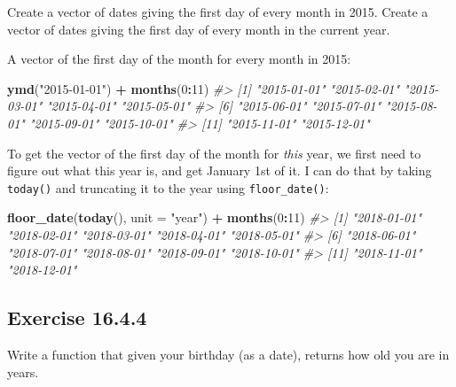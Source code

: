 \documentclass[]{book}
\newenvironment{Shaded}{\begin{snugshade}}{\end{snugshade}}
\newcommand{\CommentTok}[1]{\textcolor[rgb]{0.56,0.35,0.01}{\textit{#1}}}
\newcommand{\ControlFlowTok}[1]{\textcolor[rgb]{0.13,0.29,0.53}{\textbf{#1}}}
\newcommand{\DataTypeTok}[1]{\textcolor[rgb]{0.13,0.29,0.53}{#1}}
\newcommand{\DecValTok}[1]{\textcolor[rgb]{0.00,0.00,0.81}{#1}}
\newcommand{\KeywordTok}[1]{\textcolor[rgb]{0.13,0.29,0.53}{\textbf{#1}}}
\newcommand{\NormalTok}[1]{#1}
\newcommand{\OperatorTok}[1]{\textcolor[rgb]{0.81,0.36,0.00}{\textbf{#1}}}
\newcommand{\StringTok}[1]{\textcolor[rgb]{0.31,0.60,0.02}{#1}}
\theoremstyle{plain}
\theoremstyle{remark}
\theoremstyle{definition}
\theoremstyle{definition}
\theoremstyle{definition}
\theoremstyle{remark}
\begin{document}
Create a vector of dates giving the first day of every month in 2015.
Create a vector of dates giving the first day of every month in the
current year.

A vector of the first day of the month for every month in 2015:

\begin{Shaded}
\begin{Highlighting}[]
\KeywordTok{ymd}\NormalTok{(}\StringTok{"2015-01-01"}\NormalTok{) }\OperatorTok{+}\StringTok{ }\KeywordTok{months}\NormalTok{(}\DecValTok{0}\OperatorTok{:}\DecValTok{11}\NormalTok{)}
\CommentTok{#>  [1] "2015-01-01" "2015-02-01" "2015-03-01" "2015-04-01" "2015-05-01"}
\CommentTok{#>  [6] "2015-06-01" "2015-07-01" "2015-08-01" "2015-09-01" "2015-10-01"}
\CommentTok{#> [11] "2015-11-01" "2015-12-01"}
\end{Highlighting}
\end{Shaded}

To get the vector of the first day of the month for \emph{this} year, we
first need to figure out what this year is, and get January 1st of it. I
can do that by taking \texttt{today()} and truncating it to the year
using \texttt{floor\_date()}:

\begin{Shaded}
\begin{Highlighting}[]
\KeywordTok{floor_date}\NormalTok{(}\KeywordTok{today}\NormalTok{(), }\DataTypeTok{unit =} \StringTok{"year"}\NormalTok{) }\OperatorTok{+}\StringTok{ }\KeywordTok{months}\NormalTok{(}\DecValTok{0}\OperatorTok{:}\DecValTok{11}\NormalTok{)}
\CommentTok{#>  [1] "2018-01-01" "2018-02-01" "2018-03-01" "2018-04-01" "2018-05-01"}
\CommentTok{#>  [6] "2018-06-01" "2018-07-01" "2018-08-01" "2018-09-01" "2018-10-01"}
\CommentTok{#> [11] "2018-11-01" "2018-12-01"}
\end{Highlighting}
\end{Shaded}

\hypertarget{exercise-16.4.4}{%
\subsection*{\texorpdfstring{Exercise
{16.4.4}}{Exercise 16.4.4}}\label{exercise-16.4.4}}

Write a function that given your birthday (as a date), returns how old
you are in years.

\begin{Shaded}
\end{Shaded}
\end{document}

